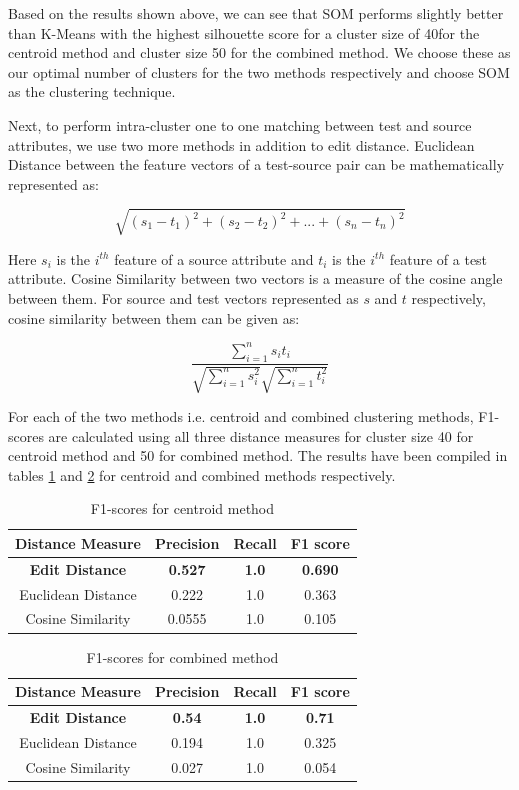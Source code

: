 \documentclass[conference]{IEEEtran}
\begin{document}
Based on the results shown above, we can see that SOM performs slightly better than K-Means with the highest silhouette score for a cluster size of 40for the centroid method and cluster size 50 for the combined method. We choose these as our optimal number of clusters for the two methods respectively and choose SOM as the clustering technique.

Next, to perform intra-cluster one to one matching between test and source attributes, we use two more methods in addition to edit distance. Euclidean Distance between the feature vectors of a test-source pair can be mathematically represented as:

\begin{equation}
\sqrt{(s_1-t_1)^2 + (s_2-t_2)^2 + ... + (s_n-t_n)^2}
\end{equation}

Here $s_i$ is the $i^{th}$ feature of a source attribute and $t_i$ is the $i^{th}$ feature of a test attribute. Cosine Similarity between two vectors is a measure of the cosine angle between them. For source and test vectors represented as $s$ and $t$ respectively, cosine similarity between them can be given as: 

\begin{equation}
\frac{\sum_{i=1}^n{s_it_i}}{\sqrt{\sum_{i=1}^ns_i^2}\sqrt{\sum_{i=1}^nt_i^2}}
\end{equation}

For each of the two methods i.e. centroid and combined clustering methods, F1-scores are calculated using all three distance measures for cluster size 40 for centroid method and 50 for combined method. The results have been compiled in tables \ref{results1} and \ref{results2} for centroid and combined methods respectively.

\begin{table}[h]
\centering
\caption{F1-scores for centroid method}
\begin{tabular}{|c|c|c|c|}
\hline
Distance Measure & Precision & Recall & F1 score\\
\hline \hline
\textbf{Edit Distance} & \textbf{0.527} & \textbf{1.0} & \textbf{0.690}\\
Euclidean Distance & 0.222 & 1.0 & 0.363\\
Cosine Similarity & 0.0555 & 1.0 & 0.105\\
\hline
\end{tabular}
\label{results1}
\end{table}


\begin{table}[h]
\centering
\caption{F1-scores for combined method}
\begin{tabular}{|c|c|c|c|}
\hline
Distance Measure & Precision & Recall & F1 score\\
\hline\hline
\textbf{Edit Distance} & \textbf{0.54} & \textbf{1.0} & \textbf{0.71}\\
Euclidean Distance & 0.194 & 1.0 & 0.325\\
Cosine Similarity & 0.027 & 1.0 & 0.054\\
\hline
\end{tabular}
\label{results2}
\end{table}
\end{document}
